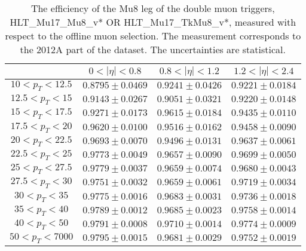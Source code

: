 \begin{table}[!ht]
\begin{center}
\begin{tabular}{c|c|c|c}
\hline & $0 < |\eta| < 0.8$ & $0.8 < |\eta| < 1.2$ & $1.2 < |\eta| < 2.4$  \\
\hline
$ 10 < p_T < 12.5$ & $0.8795 \pm 0.0469$ & $0.9241 \pm 0.0426$ & $0.9221 \pm 0.0184$  \\
$12.5 < p_T <  15$ & $0.9143 \pm 0.0267$ & $0.9051 \pm 0.0321$ & $0.9220 \pm 0.0148$  \\
$ 15 < p_T < 17.5$ & $0.9271 \pm 0.0173$ & $0.9615 \pm 0.0184$ & $0.9435 \pm 0.0110$  \\
$17.5 < p_T <  20$ & $0.9620 \pm 0.0100$ & $0.9516 \pm 0.0162$ & $0.9458 \pm 0.0090$  \\
$ 20 < p_T < 22.5$ & $0.9693 \pm 0.0070$ & $0.9496 \pm 0.0131$ & $0.9637 \pm 0.0061$  \\
$22.5 < p_T <  25$ & $0.9773 \pm 0.0049$ & $0.9657 \pm 0.0090$ & $0.9699 \pm 0.0050$  \\
$ 25 < p_T < 27.5$ & $0.9779 \pm 0.0037$ & $0.9659 \pm 0.0074$ & $0.9680 \pm 0.0043$  \\
$27.5 < p_T <  30$ & $0.9751 \pm 0.0032$ & $0.9659 \pm 0.0061$ & $0.9719 \pm 0.0034$  \\
$ 30 < p_T <  35$ & $0.9775 \pm 0.0016$ & $0.9683 \pm 0.0031$ & $0.9736 \pm 0.0018$  \\
$ 35 < p_T <  40$ & $0.9789 \pm 0.0012$ & $0.9685 \pm 0.0023$ & $0.9758 \pm 0.0014$  \\
$ 40 < p_T <  50$ & $0.9791 \pm 0.0008$ & $0.9710 \pm 0.0014$ & $0.9774 \pm 0.0009$  \\
$ 50 < p_T < 7000$ & $0.9795 \pm 0.0015$ & $0.9681 \pm 0.0029$ & $0.9752 \pm 0.0019$  \\
\hline
\hline
\end{tabular}
\caption{The efficiency of the Mu8 leg of the double muon triggers,
HLT\_Mu17\_Mu8\_v* OR HLT\_Mu17\_TkMu8\_v*,
measured with respect to the offline muon selection. 
The measurement corresponds to the 2012A part of the dataset.
The uncertainties are statistical.}
\label{tab:eff_muon_trail_dbl}
\end{center}
\end{table}


